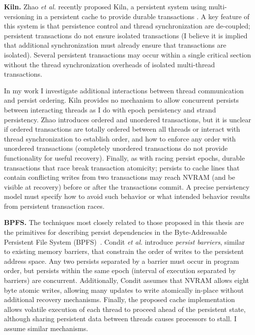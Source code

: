 \textbf{Kiln.}
Zhao \emph{et al.} recently proposed Kiln, a persistent system using multi-versioning in a persistent cache to provide durable transactions .
A key feature of this system is that persistence control and thread synchronization are de-coupled; persistent transactions do not ensure isolated transactions (I believe it is implied that additional synchronization must already ensure that transactions are isolated).
Several persistent transactions may occur within a single critical section without the thread synchronization overheads of isolated multi-thread transactions.

In my work I investigate additional interactions between thread communication and persist ordering.
Kiln provides no mechanism to allow concurrent persists between interacting threads as I do with epoch persistency and strand persistency.
Zhao introduces ordered and unordered transactions, but it is unclear if ordered transactions are totally ordered between all threads or interact with thread synchronization to establish order, and how to enforce any order with unordered transactions (completely unordered transactions do not provide functionality for useful recovery).
Finally, as with racing persist epochs, durable transactions that race break transaction atomicity; persists to cache lines that contain conflicting writes from two transactions may reach NVRAM (and be visible at recovery) before or after the transactions commit.
A precise persistency model must specify how to avoid such behavior or what intended behavior results from persistent transaction races.

\textbf{BPFS.}
The techniques most closely related to those proposed in this thesis are the primitives for describing persist dependencies in the Byte-Addressable Persistent File System (BPFS)~\cite{ConditNightingale09}.
Condit \emph{et al.} introduce \emph{persist barriers}, similar to existing memory barriers, that constrain the order of writes to the persistent address space.
Any two persists separated by a barrier must occur in program order, but persists within the same epoch (interval of execution separated by barriers) are concurrent.
Additionally, Condit assumes that NVRAM allows eight byte atomic writes, allowing many updates to write atomically in-place without additional recovery mechanisms.
Finally, the proposed cache implementation allows volatile execution of each thread to proceed ahead of the persistent state, although sharing persistent data between threads causes processors to stall.
I assume similar mechanisms.

